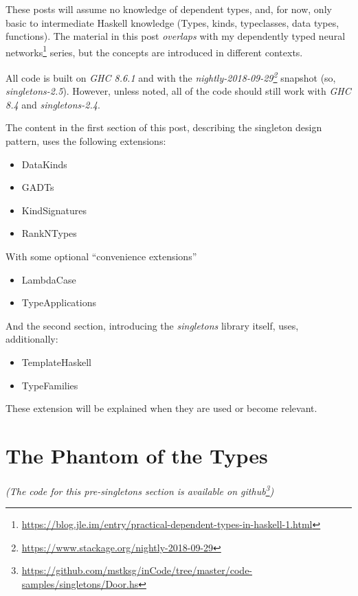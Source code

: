 \documentclass[]{article}
\renewcommand{\href}[2]{#2\footnote{\url{#1}}}
\begin{document}
These posts will assume no knowledge of dependent types, and, for now, only
basic to intermediate Haskell knowledge (Types, kinds, typeclasses, data types,
functions). The material in this post \emph{overlaps} with my
\href{https://blog.jle.im/entry/practical-dependent-types-in-haskell-1.html}{dependently
typed neural networks} series, but the concepts are introduced in different
contexts.

All code is built on \emph{GHC 8.6.1} and with the
\emph{\href{https://www.stackage.org/nightly-2018-09-29}{nightly-2018-09-29}}
snapshot (so, \emph{singletons-2.5}). However, unless noted, all of the code
should still work with \emph{GHC 8.4} and \emph{singletons-2.4}.

The content in the first section of this post, describing the singleton design
pattern, uses the following extensions:

\begin{itemize}
\tightlist
\item
  DataKinds
\item
  GADTs
\item
  KindSignatures
\item
  RankNTypes
\end{itemize}

With some optional ``convenience extensions''

\begin{itemize}
\tightlist
\item
  LambdaCase
\item
  TypeApplications
\end{itemize}

And the second section, introducing the \emph{singletons} library itself, uses,
additionally:

\begin{itemize}
\tightlist
\item
  TemplateHaskell
\item
  TypeFamilies
\end{itemize}

These extension will be explained when they are used or become relevant.

\hypertarget{the-phantom-of-the-types}{%
\section{The Phantom of the Types}\label{the-phantom-of-the-types}}

\emph{(The code for this pre-singletons section is available
\href{https://github.com/mstksg/inCode/tree/master/code-samples/singletons/Door.hs}{on
github})}
\end{document}
